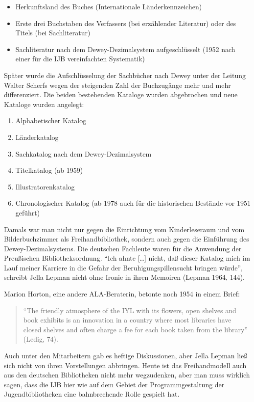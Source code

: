 \documentclass[a4paper,
fontsize=11pt,
oneside,
numbers=noperiodatend,
parskip=half-,
bibliography=totoc,
final
]{scrartcl}
\begin{document}
\begin{itemize}
\item
  Herkunftsland des Buches (Internationale Länderkennzeichen)
\item
  Erste drei Buchstaben des Verfassers (bei erzählender Literatur) oder
  des Titels (bei Sachliteratur)
\item
  Sachliteratur nach dem Dewey-Dezimalsystem aufgeschlüsselt (1952 nach
  einer für die IJB vereinfachten Systematik)
\end{itemize}

Später wurde die Aufschlüsselung der Sachbücher nach Dewey unter der
Leitung Walter Scherfs wegen der steigenden Zahl der Buchzugänge mehr
und mehr differenziert. Die beiden bestehenden Kataloge wurden
abgebrochen und neue Kataloge wurden angelegt:

\begin{enumerate}
\def\labelenumi{\arabic{enumi}.}
\item
  Alphabetischer Katalog
\item
  Länderkatalog
\item
  Sachkatalog nach dem Dewey-Dezimalsystem
\item
  Titelkatalog (ab 1959)
\item
  Illustratorenkatalog
\item
  Chronologischer Katalog (ab 1978 auch für die historischen Bestände
  vor 1951 geführt)
\end{enumerate}

Damals war man nicht nur gegen die Einrichtung vom Kinderleseraum und
vom Bilderbuchzimmer als Freihandbibliothek, sondern auch gegen die
Einführung des Dewey-Dezimalsystems. Die deutschen Fachleute waren für
die Anwendung der Preußischen Bibliotheksordnung. \enquote{Ich ahnte
{[}\ldots{}{]} nicht, daß dieser Katalog mich im Lauf meiner Karriere in
die Gefahr der Beruhigungspillensucht bringen würde}, schreibt Jella
Lepman nicht ohne Ironie in ihren Memoiren (Lepman 1964, 144).

Marion Horton, eine andere ALA-Beraterin, betonte noch 1954 in einem
Brief:

\begin{quote}
\enquote{The friendly atmosphere of the IYL with its flowers, open
shelves and book exhibits is an innovation in a country where most
libraries have closed shelves and often charge a fee for each book taken
from the library} (Ledig, 74).
\end{quote}

Auch unter den Mitarbeitern gab es heftige Diskussionen, aber Jella
Lepman ließ sich nicht von ihren Vorstellungen abbringen. Heute ist das
Freihandmodell auch aus den deutschen Bibliotheken nicht mehr
wegzudenken, aber man muss wirklich sagen, dass die IJB hier wie auf dem
Gebiet der Programmgestaltung der Jugendbibliotheken eine bahnbrechende
Rolle gespielt hat.
\end{document}
